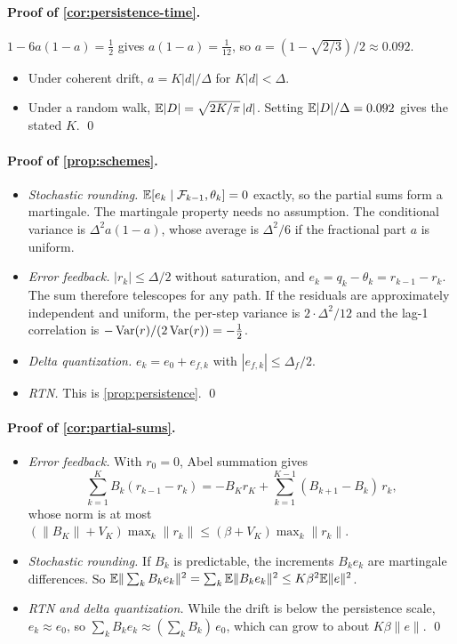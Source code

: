 \paragraph{Proof of \cref{cor:persistence-time}.} $1-6a(1-a)=\tfrac12$ gives $a(1-a)=\tfrac1{12}$, so $a=(1-\sqrt{2/3})/2\approx0.092$.
\begin{itemize}[leftmargin=*,itemsep=1pt]
\item Under coherent drift, $a=K|d|/\Delta$ for $K|d|<\Delta$.
\item Under a random walk, $\mathbb{E}|D|=\sqrt{2K/\pi}\,|d|$. Setting $\mathbb{E}|D|/\Delta=0.092$ gives the stated $K$. \qed
\end{itemize}

\paragraph{Proof of \cref{prop:schemes}.}
\begin{itemize}[leftmargin=*,itemsep=1pt]
\item \emph{Stochastic rounding.} $\mathbb{E}[e_k\mid\mathcal F_{k-1},\theta_k]=0$ exactly, so the partial sums form a martingale. The martingale property needs no assumption. The conditional variance is $\Delta^2a(1-a)$, whose average is $\Delta^2/6$ if the fractional part $a$ is uniform.
\item \emph{Error feedback.} $|r_k|\le\Delta/2$ without saturation, and $e_k=q_k-\theta_k=r_{k-1}-r_k$. The sum therefore telescopes for any path. If the residuals are approximately independent and uniform, the per-step variance is $2\cdot\Delta^2/12$ and the lag-1 correlation is $-\operatorname{Var}(r)/(2\operatorname{Var}(r))=-\tfrac12$.
\item \emph{Delta quantization.} $e_k=e_0+e_{f,k}$ with $|e_{f,k}|\le\Delta_f/2$.
\item \emph{RTN.} This is \cref{prop:persistence}. \qed
\end{itemize}

\paragraph{Proof of \cref{cor:partial-sums}.}
\begin{itemize}[leftmargin=*,itemsep=1pt]
\item \emph{Error feedback.} With $r_0=0$, Abel summation gives
\[
\sum_{k=1}^KB_k(r_{k-1}-r_k)=-B_Kr_K+\sum_{k=1}^{K-1}(B_{k+1}-B_k)\,r_k ,
\]
whose norm is at most $(\|B_K\|+V_K)\max_k\|r_k\|\le(\beta+V_K)\max_k\|r_k\|$.
\item \emph{Stochastic rounding.} If $B_k$ is predictable, the increments $B_ke_k$ are martingale differences. So $\mathbb{E}\|\sum_kB_ke_k\|^2=\sum_k\mathbb{E}\|B_ke_k\|^2\le K\beta^2\mathbb{E}\|e\|^2$.
\item \emph{RTN and delta quantization.} While the drift is below the persistence scale, $e_k\approx e_0$, so $\sum_kB_ke_k\approx(\sum_kB_k)\,e_0$, which can grow to about $K\beta\|e\|$. \qed
\end{itemize}

